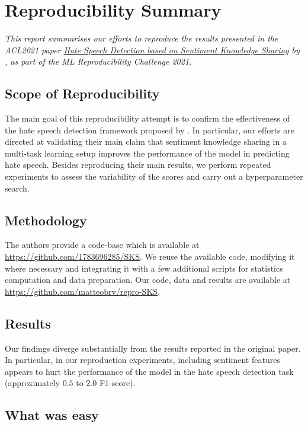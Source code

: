 \section{Reproducibility Summary}

\textit{This report summarises our efforts to reproduce the results presented in the ACL2021 paper \href{https://aclanthology.org/2021.acl-long.556/}{Hate Speech Detection based on Sentiment Knowledge Sharing} by \cite{original_zhou}, as part of the ML Reproducibility Challenge 2021.}


\subsection{Scope of Reproducibility}

The main goal of this reproducibility attempt is to confirm the effectiveness of the hate speech detection framework proposed by \cite{original_zhou}. In particular, our efforts are directed at validating their main claim that sentiment knowledge sharing in a multi-task learning setup improves the performance of the model in predicting hate speech. Besides reproducing their main results, we perform repeated experiments to assess the variability of the scores and carry out a hyperparameter search.


\subsection{Methodology}

The authors provide a code-base which is available at \url{https://github.com/1783696285/SKS}. We reuse the available code, modifying it where necessary and integrating it with a few additional scripts for statistics computation and data preparation. Our code, data and results are available at 
\url{https://github.com/matteobrv/repro-SKS}.


\subsection{Results}

Our findings diverge substantially from the results reported in the original paper. In particular, in our reproduction experiments, including sentiment features appears to hurt the performance of the model in the hate speech detection task (approximately $0.5$ to $2.0$ F1-score).


\subsection{What was easy}

